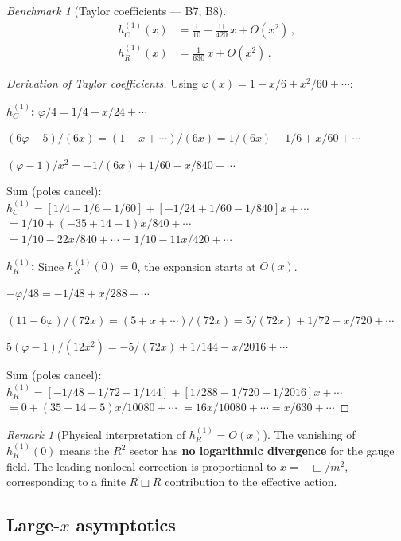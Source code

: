 \documentclass[12pt,a4paper]{article}
\theoremstyle{definition}
\theoremstyle{remark}
\newtheorem{remark}[proposition]{Remark}
\newtheorem{benchmark}[proposition]{Benchmark}
\begin{document}
\begin{benchmark}[Taylor coefficients --- B7, B8]
\label{bench:taylor}
\begin{align}
  h_C^{(1)}(x) &= \frac{1}{10}
    - \frac{11}{420}\,x + O(x^2)\,,
  \label{eq:hC-taylor}\\[4pt]
  h_R^{(1)}(x) &= \frac{1}{630}\,x + O(x^2)\,.
  \label{eq:hR-taylor}
\end{align}
\end{benchmark}

\begin{proof}[Derivation of Taylor coefficients]
Using $\varphi(x) = 1 - x/6 + x^2/60 + \cdots$:

\noindent\textbf{$h_C^{(1)}$:}
$\varphi/4 = 1/4 - x/24 + \cdots$

$(6\varphi-5)/(6x) = (1-x+\cdots)/(6x)
= 1/(6x) - 1/6 + x/60 + \cdots$

$(\varphi-1)/x^2 = -1/(6x) + 1/60 - x/840 + \cdots$

Sum (poles cancel):
$h_C^{(1)} = [1/4 - 1/6 + 1/60]
+ [-1/24 + 1/60 - 1/840]x + \cdots$
$= 1/10 + (-35 + 14 - 1)x/840 + \cdots$
$= 1/10 - 22x/840 + \cdots
= 1/10 - 11x/420 + \cdots$

\noindent\textbf{$h_R^{(1)}$:}
Since $h_R^{(1)}(0) = 0$, the expansion starts at $O(x)$.

$-\varphi/48 = -1/48 + x/288 + \cdots$

$(11-6\varphi)/(72x) = (5+x+\cdots)/(72x)
= 5/(72x) + 1/72 - x/720 + \cdots$

$5(\varphi-1)/(12x^2) = -5/(72x) + 1/144 - x/2016 + \cdots$

Sum (poles cancel):
$h_R^{(1)} = [-1/48 + 1/72 + 1/144]
+ [1/288 - 1/720 - 1/2016]x + \cdots$
$= 0 + (35 - 14 - 5)x/10080 + \cdots$
$= 16x/10080 + \cdots = x/630 + \cdots$
\end{proof}

\begin{remark}[Physical interpretation of $h_R^{(1)} = O(x)$]
The vanishing of $h_R^{(1)}(0)$ means the $R^2$ sector
has \textbf{no logarithmic divergence} for the gauge field.
The leading nonlocal correction is proportional to $x = -\Box/m^2$,
corresponding to a finite $R\Box R$ contribution to the effective
action.
\end{remark}


\subsection{Large-$x$ asymptotics}
\end{document}
